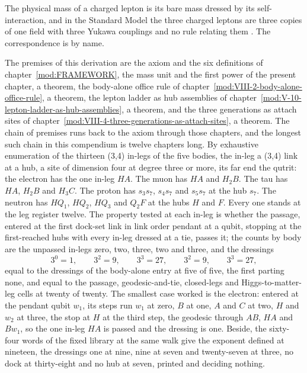 \begin{chbridge}
The physical mass of a charged lepton is its bare mass dressed by its self-interaction, and in the Standard Model the three charged leptons are three copies of one field with three Yukawa couplings and no rule relating them \cite{Weinberg1967,Peskin1995}. The correspondence is by name.
\end{chbridge}
\begin{chproof}
The premises of this derivation are the axiom and the six definitions of chapter~\ref{mod:FRAMEWORK}, the mass unit and the first power of the present chapter, a theorem, the body-alone office rule of chapter~\ref{mod:VIII-2-body-alone-office-rule}, a theorem, the lepton ladder as hub assemblies of chapter~\ref{mod:V-10-lepton-ladder-as-hub-assemblies}, a theorem, and the three generations as attach sites of chapter~\ref{mod:VIII-4-three-generations-as-attach-sites}, a theorem. The chain of premises runs back to the axiom through those chapters, and the longest such chain in this compendium is twelve chapters long.
By exhaustive enumeration of the thirteen (3,4) in-legs of the five bodies, the in-leg a (3,4) link at a hub, a site of dimension four at degree three or more, its far end the qutrit: the electron has the one in-leg $HA$. The muon has $HA$ and $H_{2}B$. The tau has $HA$, $H_{2}B$ and $H_{3}C$. The proton has $s_{3}s_{7}$, $s_{4}s_{7}$ and $s_{5}s_{7}$ at the hub $s_{7}$. The neutron has $HQ_{1}$, $HQ_{2}$, $HQ_{3}$ and $Q_{2}F$ at the hubs $H$ and $F$. Every one stands at the leg register twelve. The property tested at each in-leg is whether the passage, entered at the first dock-set link in link order pendant at a qubit, stopping at the first-reached hubs with every in-leg dressed at a tie, passes it; the counts by body are the unpassed in-legs zero, two, three, two and three, and the dressings
\begin{equation} 3^{0} = 1, \qquad 3^{2} = 9, \qquad 3^{3} = 27, \qquad 3^{2} = 9, \qquad 3^{3} = 27, \end{equation}
equal to the dressings of the body-alone entry at five of five, the first parting none, and equal to the passage, geodesic-and-tie, closed-legs and Higgs-to-matter-leg cells at twenty of twenty. The smallest case worked is the electron: entered at the pendant qubit $w_{1}$, its steps run $w_{1}$ at zero, $B$ at one, $A$ and $C$ at two, $H$ and $w_{2}$ at three, the stop at $H$ at the third step, the geodesic through $AB$, $HA$ and $Bw_{1}$, so the one in-leg $HA$ is passed and the dressing is one. Beside, the sixty-four words of the fixed library at the same walk give the exponent defined at nineteen, the dressings one at nine, nine at seven and twenty-seven at three, no dock at thirty-eight and no hub at seven, printed and deciding nothing.

\end{chproof}
